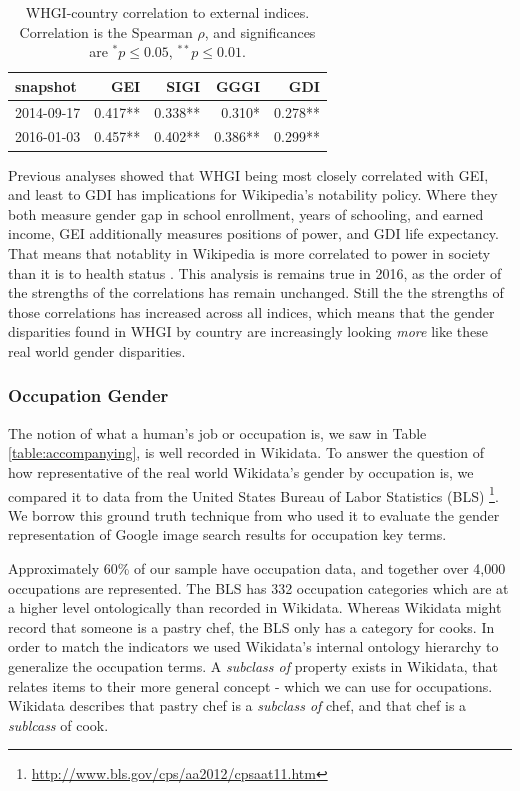 \documentclass{sig-alternate-05-2015}
\begin{document}
\begin{table}
\caption{WHGI-country correlation to external indices. Correlation is the Spearman $\rho$, and significances are $ ^*p\leq 0.05 $, $ ^{**}p\leq 0.01$.}
\label{table:scores}
\begin{tabular}{lrrrr}
\toprule
snapshot &  GEI &  SIGI &  GGGI &  GDI  \\
\midrule
2014-09-17 &  0.417** &       0.338** &          0.310* &         0.278**  \\
2016-01-03 &  0.457** &       0.402** &          0.386** &         0.299**  \\
\bottomrule
\end{tabular}
\end{table}

Previous analyses showed that WHGI being most closely correlated with  GEI, and least to GDI has implications for Wikipedia's notability policy. Where they both measure gender gap in school enrollment, years of schooling, and earned income, GEI additionally measures positions of power, and GDI life expectancy. That means that notablity in Wikipedia is more correlated to power in society than it is to health status \cite{klein_wikipedia_2015}. This analysis is remains true in 2016, as the order of the strengths of the correlations has remain unchanged. Still the the strengths of those correlations has increased across all indices, which means that the gender disparities found in WHGI by country are increasingly looking \textit{more} like these real world gender disparities.


\subsubsection{Occupation Gender}
The notion of what a human's job or occupation is, we saw in Table \ref{table:accompanying}, is well recorded in Wikidata. To answer the question of how representative of the real world Wikidata's gender by occupation is, we compared it to data from the United States Bureau of Labor Statistics (BLS) \footnote{\url{http://www.bls.gov/cps/aa2012/cpsaat11.htm}}. We borrow this ground truth technique from \cite{kay_unequal_2015} who used it to evaluate the gender representation of Google image search results for occupation key terms.

Approximately 60\% of our sample have occupation data, and together over 4,000 occupations are represented. The BLS has 332 occupation categories which are at a higher level ontologically than  recorded in Wikidata. Whereas Wikidata might record that someone is a pastry chef, the BLS only has a category for cooks. In order to match the indicators we used Wikidata's internal ontology hierarchy to generalize the occupation terms. A \textit{subclass of} property exists in Wikidata, that relates items to their more general concept - which we can use for occupations. Wikidata describes that pastry chef is a \textit{subclass of} chef, and that chef is a \textit{sublcass} of cook. 
\end{document}
